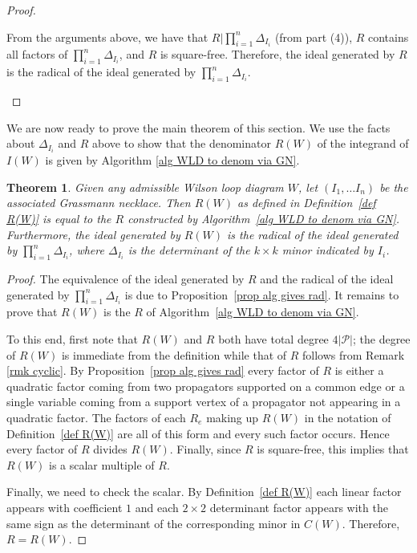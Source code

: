 \documentclass[11pt]{article}
\newtheorem{thm}{Theorem}[section]
\theoremstyle{remark}
\theoremstyle{definition}
\begin{document}
\begin{proof}
\begin{enumerate}
{}From the arguments above, we have that $R|\prod_{i=1}^n \Delta_{I_i}$ (from part (4)), $R$ contains all factors of $\prod_{i=1}^n \Delta_{I_i}$, and $R$ is square-free.  Therefore, the ideal generated by $R$ is the radical of the ideal generated by $\prod_{i=1}^n \Delta_{I_i}$.
  \end{enumerate}
\end{proof}

We are now ready to prove the main theorem of this section. We use the facts about $\Delta_{I_i}$ and $R$ above to show that the denominator $R(W)$ of the integrand of $I(W)$ is given by Algorithm \ref{alg WLD to denom via GN}.

\begin{thm}\label{thm denom}
  Given any admissible Wilson loop diagram $W$, let $(I_1, \ldots I_n)$ be the associated Grassmann necklace. Then $R(W)$ as defined in Definition~\ref{def R(W)} is equal to the $R$ constructed by Algorithm~\ref{alg WLD to denom via GN}. Furthermore, the ideal generated by $R(W)$ is the radical of the ideal generated by $\prod_{i=1}^n \Delta_{I_i}$, where $\Delta_{I_i}$ is the determinant of the $k \times k$ minor indicated by $I_i$.  
\end{thm}

\begin{proof}
The equivalence of the ideal generated by $R$ and the radical of the ideal generated by $\prod_{i=1}^n \Delta_{I_i}$ is due to Proposition~\ref{prop alg gives rad}.  It remains to prove that $R(W)$ is the $R$ of Algorithm~\ref{alg WLD to denom via GN}.

To this end, first note that $R(W)$ and $R$ both have total degree $4|\mathcal{P}|$; the degree of $R(W)$ is immediate from the definition while that of $R$ follows from Remark \ref{rmk cyclic}.  By Proposition~\ref{prop alg gives rad} every factor of $R$ is either a quadratic factor coming from two propagators supported on a common edge or a single variable coming from a support vertex of a propagator not appearing in a quadratic factor.  The factors of each $R_e$ making up $R(W)$ in the notation of Definition~\ref{def R(W)} are all of this form and every such factor occurs.  Hence every factor of $R$ divides $R(W)$.
Finally, since $R$ is square-free, this implies that $R(W)$ is a scalar multiple of $R$.

Finally, we need to check the scalar.  By Definition~\ref{def R(W)} each linear factor appears with coefficient $1$ and each $2\times 2$ determinant factor appears with the same sign as the determinant of the corresponding minor in $C(W)$.  Therefore, $R=R(W)$.
\end{proof}
\end{document}
